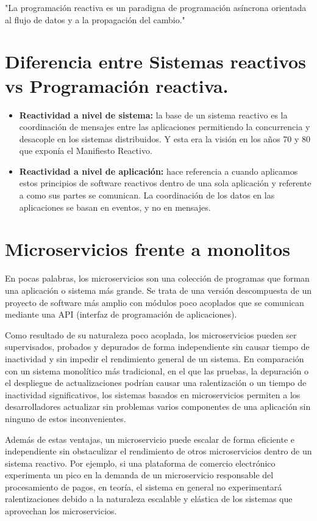 \documentclass[12pt]{article}
\begin{document}
"La programación reactiva es un paradigna de programación asíncrona orientada al flujo de datos y a la propagación del cambio."

\section*{Diferencia entre Sistemas reactivos vs Programación reactiva.}
\begin{itemize}
    \item \textbf{Reactividad a nivel de sistema:} la base de un sistema reactivo es la coordinación de mensajes entre las aplicaciones permitiendo la concurrencia y desacople en los sistemas distribuidos. Y esta era la visión en los años 70 y 80 que exponía el Manifiesto Reactivo.
\end{itemize}
\begin{itemize}
    \item \textbf{Reactividad a nivel de aplicación:} hace referencia a cuando aplicamos estos principios de software reactivos dentro de una sola aplicación y referente a como sus partes se comunican. La coordinación de los datos en las aplicaciones se basan en eventos, y no en mensajes.
\end{itemize}

\section*{Microservicios frente a monolitos}

En pocas palabras, los microservicios son una colección de programas que forman una aplicación o sistema más grande. Se trata de una versión descompuesta de un proyecto de software más amplio con módulos poco acoplados que se comunican mediante una API (interfaz de programación de aplicaciones).

Como resultado de su naturaleza poco acoplada, los microservicios pueden ser supervisados, probados y depurados de forma independiente sin causar tiempo de inactividad y sin impedir el rendimiento general de un sistema. En comparación con un sistema monolítico más tradicional, en el que las pruebas, la depuración o el despliegue de actualizaciones podrían causar una ralentización o un tiempo de inactividad significativos, los sistemas basados en microservicios permiten a los desarrolladores actualizar sin problemas varios componentes de una aplicación sin ninguno de estos inconvenientes.

Además de estas ventajas, un microservicio puede escalar de forma eficiente e independiente sin obstaculizar el rendimiento de otros microservicios dentro de un sistema reactivo. Por ejemplo, si una plataforma de comercio electrónico experimenta un pico en la demanda de un microservicio responsable del procesamiento de pagos, en teoría, el sistema en general no experimentará ralentizaciones debido a la naturaleza escalable y elástica de los sistemas que aprovechan los microservicios.
\end{document}
